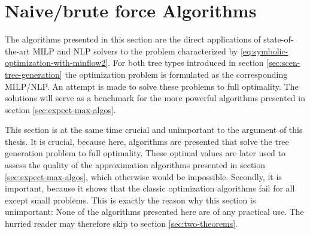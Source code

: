 \section{Naive/brute force Algorithms}
\label{sec:naive}
The algorithms presented in this section are the direct applications of state-of-the-art MILP and NLP solvers to the problem characterized by \eqref{eq:symbolic-optimization-with-minflow2}. For both tree types introduced in section \ref{sec:scen-tree-generation} the optimization problem is formulated as the corresponding MILP/NLP. An attempt is made to solve these problems to full optimality.
The solutions will serve as a benchmark for the more powerful algorithms presented in section \ref{sec:expect-max-algos}.

This section is at the same time crucial and unimportant to the argument of this thesis.
It is crucial, because here, algorithms are presented that solve the tree generation problem to full optimality.
These optimal values are later used to assess the quality of the approximation algorithms presented in section \ref{sec:expect-max-algos}, which otherwise would be impossible.
Secondly, it is important, because it shows that the classic optimization algorithms fail for all except small problems.
This is exactly the reason why this section is unimportant: None of the algorithms presented here are of any practical use.
The hurried reader may therefore skip to section \ref{sec:two-theorems}.


